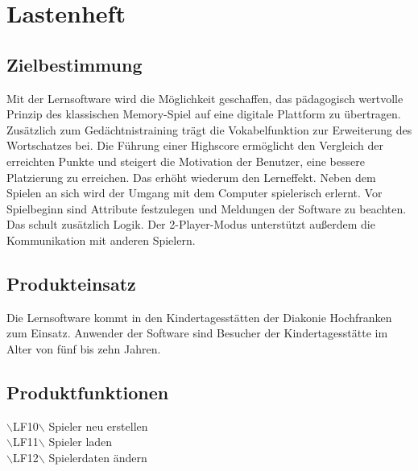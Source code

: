 \clearpage
\chapter{Lastenheft}

\section{Zielbestimmung} %
Mit der Lernsoftware wird die Möglichkeit geschaffen, das pädagogisch wertvolle Prinzip des klassischen Memory-Spiel auf eine digitale Plattform zu übertragen. Zusätzlich zum Gedächtnistraining trägt die Vokabelfunktion zur Erweiterung des Wortschatzes bei. Die Führung einer Highscore ermöglicht den Vergleich der erreichten Punkte und steigert die Motivation der Benutzer, eine bessere Platzierung zu erreichen. Das erhöht wiederum den Lerneffekt. Neben dem Spielen an sich wird der Umgang mit dem Computer spielerisch erlernt. Vor Spielbeginn sind Attribute festzulegen und Meldungen der Software zu beachten. Das schult zusätzlich Logik. Der 2-Player-Modus unterstützt außerdem die Kommunikation mit anderen Spielern.


\section{Produkteinsatz} %
Die Lernsoftware kommt in den Kindertagesstätten der Diakonie Hochfranken zum Einsatz. Anwender der Software sind Besucher der Kindertagesstätte im Alter von fünf bis zehn Jahren.

\section{Produktfunktionen} %

$\backslash$LF10$\backslash$ \hspace{15 mm}Spieler neu erstellen \\
$\backslash$LF11$\backslash$ \hspace{15 mm}Spieler laden\\ %
$\backslash$LF12$\backslash$ \hspace{15 mm}Spielerdaten ändern\\ \\  %

